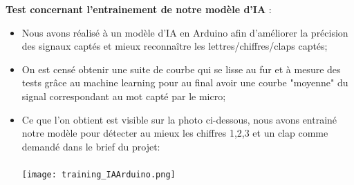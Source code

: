 \documentclass[a4paper,11pt]{book}
\begin{document}
\vspace{2mm}

\noindent \textbf{Test concernant l'entrainement de notre modèle d'IA} : 
\begin{itemize}
	\item Nous avons réalisé à un modèle d'IA en Arduino afin d'améliorer la précision des signaux captés et mieux reconnaître les lettres/chiffres/claps captés;
	\item On est censé obtenir une suite de courbe qui se lisse au fur et à mesure des tests grâce au machine learning pour au final avoir une courbe "moyenne" du signal correspondant au mot capté par le micro;
	\item Ce que l’on obtient est visible sur la photo ci-dessous, nous avons entrainé notre modèle pour détecter au mieux les chiffres 1,2,3 et un clap comme demandé dans le brief du projet: \\ \\
	\vspace{2mm}
	\texttt{[image: training\_IAArduino.png]}

\end{itemize}
\end{document}
